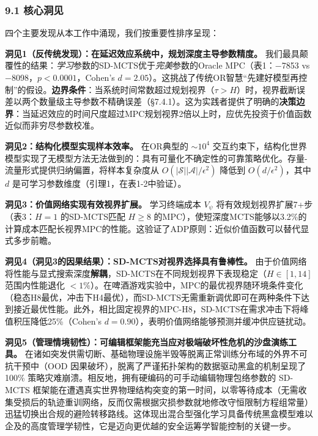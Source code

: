 \documentclass[UTF8]{ctexart}
\begin{document}
\hypertarget{ux6838ux5fc3ux6d1eux89c1}{%
\subsubsection{9.1 核心洞见}\label{ux6838ux5fc3ux6d1eux89c1}}

四个主要发现从本工作中涌现，我们按重要性排序呈现：

\textbf{洞见1（反传统发现）：在延迟效应系统中，规划深度主导参数精度。}
我们最具颠覆性的结果：\emph{学习}参数的SD-MCTS优于\emph{完美}参数的Oracle
MPC（表1：−7853 vs −8098，\(p < 0.0001\)，Cohen's
\(d = 2.05\)）。这挑战了传统OR智慧``先建好模型再控制''的假设。\textbf{边界条件}：当系统时间常数超过规划视界（\(\tau > H\)）时，视界截断误差以两个数量级主导参数不精确误差（§7.4.1）。这为实践者提供了明确的\textbf{决策边界}：当延迟效应的时间尺度超过MPC规划视界2倍以上时，应优先投资于价值函数近似而非穷尽参数校准。

\textbf{洞见2：结构化模型实现样本效率。} 在OR典型的 \(\sim 10^4\)
交互约束下，结构化世界模型实现了无模型方法无法做到的：具有可量化不确定性的可靠策略优化。存量-流量形式提供归纳偏置，将样本复杂度从
\(O(|\mathcal{S}||\mathcal{A}|/\epsilon^2)\) 降低到
\(O(d/\epsilon^2)\)，其中 \(d\)
是可学习参数维度（引理1，在表1-2中验证）。

\textbf{洞见3：价值网络实现有效视界扩展。} 学习终端成本 \(V_\psi\)
将有效规划视界扩展7+步（表3：\(H=1\) 的SD-MCTS匹配 \(H \geq 8\)
的MPC），使短深度MCTS能够以3.2\%的计算成本匹配长视界MPC的性能。这验证了ADP原则：近似价值函数可以替代显式多步前瞻。

\textbf{洞见4（洞见3的因果结果）：SD-MCTS对视界选择具有鲁棒性。}
由于价值网络将性能与显式搜索深度\textbf{解耦}，SD-MCTS在不同规划视界下表现稳定（\(H \in [1, 14]\)
范围内性能退化
\(< 1\%\)）。在啤酒游戏实验中，MPC的最优视界随环境条件变化（稳态H8最优，冲击下H4最优），而SD-MCTS无需重新调优即可在两种条件下达到接近最优性能。此外，相比固定视界的MPC-H8，SD-MCTS在需求冲击下将峰值积压降低25\%（Cohen's
\(d = 0.90\)），表明价值网络能够预测并缓冲供应链扰动。

\textbf{洞见5（管理情境韧性）：可编辑框架能充当应对极端破坏性危机的沙盘演练工具。}
在诸如突发供需切断、基础物理设施半毁等脱离正常训练分布域的外界不可抗干预中（OOD
因果破坏），脱离了严谨拓扑架构的数据驱动黑盒的机制呈现了 100\%
策略灾难崩溃。相反地，拥有硬编码的可手动编辑物理包络参数的 SD-MCTS
框架能在遭遇真实世界物理结构突变的第一时间，以零等待成本（无需收集受损后的轨迹重训网络，反而仅需根据灾损参数就地修改守恒限制方程组常量）迅猛切换出合规的避险转移路线。这体现出混合型强化学习具备传统黑盒模型难以企及的高度管理学韧性，它是迈向更优越的安全运筹学智能控制的关键一步。
\end{document}
